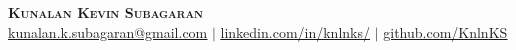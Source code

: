 \begin{center}
	\textbf{\Huge \scshape Kunalan Kevin Subagaran} \\ \vspace{5pt}
    \href{mailto:kunalan.k.subagaran@gmail.com}{\underline{kunalan.k.subagaran@gmail.com}} $|$
	\href{https://www.linkedin.com/in/knlnks/}{\underline{linkedin.com/in/knlnks/}} $|$
	\href{https://github.com/KnlnKS}{\underline{github.com/KnlnKS}}
\end{center}
